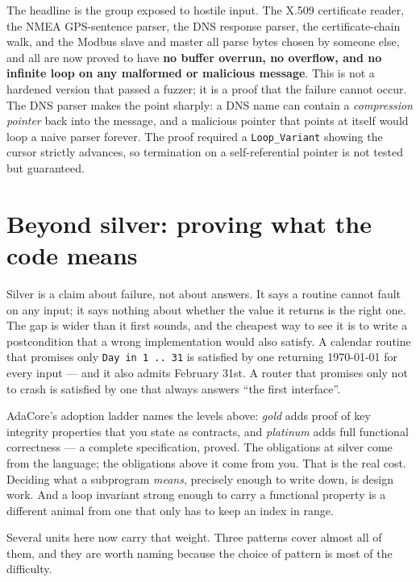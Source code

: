 The headline is the group exposed to hostile input. The X.509 certificate reader, the
NMEA GPS-sentence parser, the DNS response parser, the certificate-chain walk, and the
Modbus slave and master all parse bytes chosen by someone else, and all are now proved
to have \textbf{no buffer overrun, no overflow, and no infinite loop on any malformed
or malicious message}. This is not a hardened version that passed a fuzzer; it is a
proof that the failure cannot occur. The DNS parser makes the point sharply: a DNS
name can contain a \emph{compression pointer} back into the message, and a malicious
pointer that points at itself would loop a naive parser forever. The proof required a
\lstinline{Loop_Variant} showing the cursor strictly advances, so termination on a
self-referential pointer is not tested but guaranteed.

\section{Beyond silver: proving what the code means}\label{spark:gold}

Silver is a claim about failure, not about answers. It says a routine cannot fault
on any input; it says nothing about whether the value it returns is the right one. The
gap is wider than it first sounds, and the cheapest way to see it is to write a
postcondition that a wrong implementation would also satisfy. A calendar routine that
promises only \lstinline{Day in 1 .. 31} is satisfied by one returning 1970-01-01 for
every input --- and it also admits February 31st. A router that promises only not to
crash is satisfied by one that always answers ``the first interface''.

AdaCore's adoption ladder names the levels above: \emph{gold} adds proof of key
integrity properties that you state as contracts, and \emph{platinum} adds full
functional correctness --- a complete specification, proved. The obligations at silver
come from the language; the obligations above it come from you. That is the real cost.
Deciding what a subprogram \emph{means}, precisely enough to write down, is design work.
And a loop invariant strong enough to carry a functional property is a different animal
from one that only has to keep an index in range.

Several units here now carry that weight. Three patterns cover almost all of them, and
they are worth naming because the choice of pattern is most of the difficulty.

